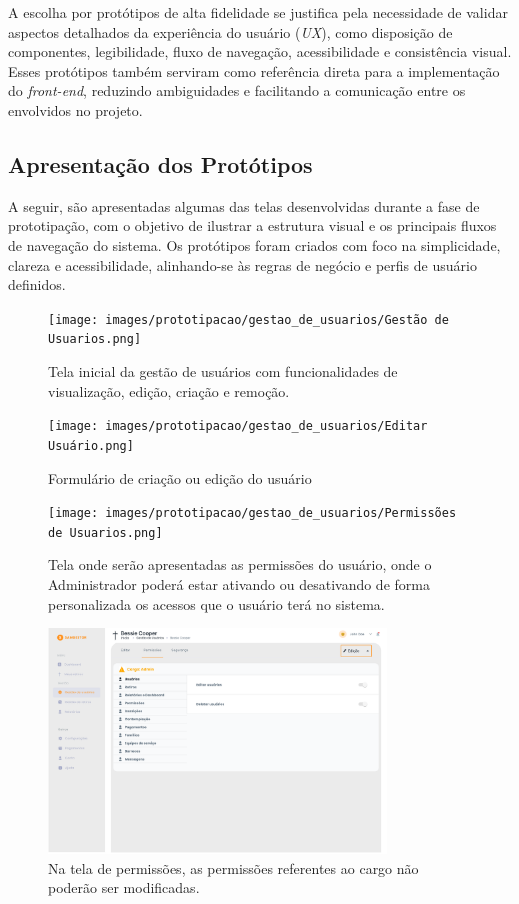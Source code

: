 A escolha por protótipos de alta fidelidade se justifica pela necessidade de validar aspectos detalhados da experiência do usuário (\textit{UX}), como disposição de componentes, legibilidade, fluxo de navegação, acessibilidade e consistência visual. Esses protótipos também serviram como referência direta para a implementação do \textit{front-end}, reduzindo ambiguidades e facilitando a comunicação entre os envolvidos no projeto.

\subsection{Apresentação dos Protótipos}

A seguir, são apresentadas algumas das telas desenvolvidas durante a fase de prototipação, com o objetivo de ilustrar a estrutura visual e os principais fluxos de navegação do sistema. Os protótipos foram criados com foco na simplicidade, clareza e acessibilidade, alinhando-se às regras de negócio e perfis de usuário definidos.

\begin{figure}[H]
\centering
\texttt{[image: images/prototipacao/gestao\_de\_usuarios/Gestão de Usuarios.png]}
\caption{Tela inicial da gestão de usuários com funcionalidades de visualização, edição, criação e remoção.}
\end{figure}

\begin{figure}[H]
\centering
\texttt{[image: images/prototipacao/gestao\_de\_usuarios/Editar Usuário.png]}
\caption{Formulário de criação ou edição do usuário}
\end{figure}

\begin{figure}[H]
\centering
\texttt{[image: images/prototipacao/gestao\_de\_usuarios/Permissões de Usuarios.png]}
\caption{Tela onde serão apresentadas as permissões do usuário, onde o Administrador poderá estar ativando ou desativando de forma personalizada os acessos que o usuário terá no sistema.}
\end{figure}

\begin{figure}[H]
\centering
\includegraphics[width=0.8\textwidth]{images/prototipacao/gestao_de_usuarios/Permissões obrigatórias do cargo.png}
\caption{Na tela de permissões, as permissões referentes ao cargo não poderão ser modificadas.}
\end{figure}

